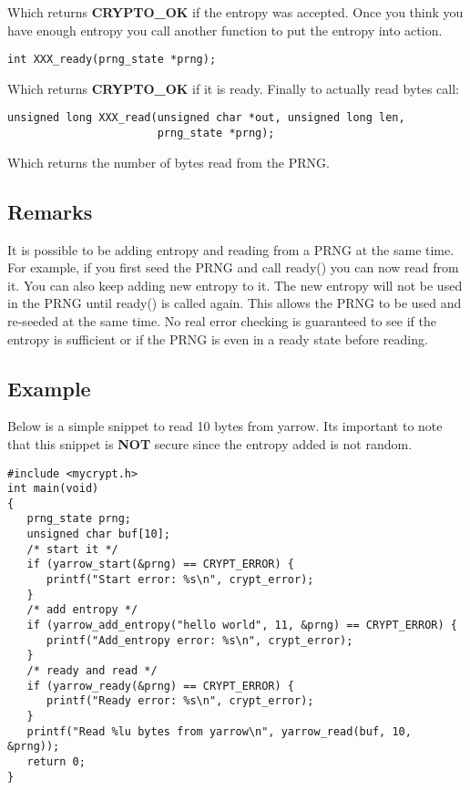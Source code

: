 \documentclass{book}
\begin{document}
Which returns {\bf CRYPTO\_OK} if the entropy was accepted.  Once you think you have enough entropy you call another
function to put the entropy into action.
\begin{verbatim}
int XXX_ready(prng_state *prng);
\end{verbatim}

Which returns {\bf CRYPTO\_OK} if it is ready.  Finally to actually read bytes call:
\begin{verbatim}
unsigned long XXX_read(unsigned char *out, unsigned long len,
                       prng_state *prng);
\end{verbatim}

Which returns the number of bytes read from the PRNG.

\subsection{Remarks}

It is possible to be adding entropy and reading from a PRNG at the same time.  For example, if you first seed the PRNG
and call ready() you can now read from it.  You can also keep adding new entropy to it.  The new entropy will not be used
in the PRNG until ready() is called again.  This allows the PRNG to be used and re-seeded at the same time.  No real error 
checking is guaranteed to see if the entropy is sufficient or if the PRNG is even in a ready state before reading.

\subsection{Example}

Below is a simple snippet to read 10 bytes from yarrow.  Its important to note that this snippet is {\bf NOT} secure since
the entropy added is not random.

\begin{verbatim}
#include <mycrypt.h>
int main(void)
{
   prng_state prng;
   unsigned char buf[10];
   /* start it */
   if (yarrow_start(&prng) == CRYPT_ERROR) {
      printf("Start error: %s\n", crypt_error);
   }
   /* add entropy */
   if (yarrow_add_entropy("hello world", 11, &prng) == CRYPT_ERROR) {
      printf("Add_entropy error: %s\n", crypt_error);
   }
   /* ready and read */
   if (yarrow_ready(&prng) == CRYPT_ERROR) {
      printf("Ready error: %s\n", crypt_error);
   }
   printf("Read %lu bytes from yarrow\n", yarrow_read(buf, 10, &prng));
   return 0;
}
\end{verbatim}
\end{document}
